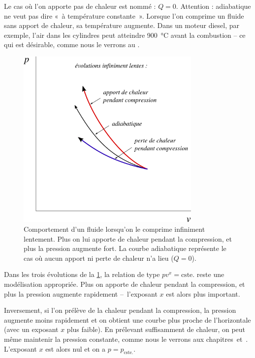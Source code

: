 		Le cas où l’on apporte pas de chaleur est nommé  : $Q = 0$. Attention : adiabatique ne veut pas dire «~à température constante~». Lorsque l’on comprime un fluide sans apport de chaleur, sa température augmente. Dans un moteur diesel, par exemple, l’air dans les cylindres peut atteindre \SI{900}{\degreeCelsius} avant la combustion -- ce qui est désirable, comme nous le verrons au \courssept.

		\begin{figure}
			\begin{center}
			\includegraphics[width=9cm]{images/pv_transfert_chaleur.png}
			\end{center}
			\caption{Comportement d’un fluide lorsqu’on le comprime infiniment lentement.
Plus on lui apporte de chaleur pendant la compression, et plus la pression augmente fort. La courbe adiabatique représente le cas où aucun apport ni perte de chaleur n’a lieu ($Q = 0$).}
			\label{fig_p-v_ajout_retrait_chaleur}
		\end{figure}


		Dans les trois évolutions de la \cref{fig_p-v_ajout_retrait_chaleur}, la relation de type $p v^{x} = \text{cste.}$ reste une modélisation appropriée. Plus on apporte de chaleur pendant la compression, et plus la pression augmente rapidement --\ l’exposant $x$ est alors plus important.

		Inversement, si l’on prélève de la chaleur pendant la compression, la pression augmente moins rapidement et on obtient une courbe plus proche de l’horizontale (avec un exposant  $x$ plus faible). En prélevant suffisamment de chaleur, on peut même maintenir la pression constante, comme nous le verrons aux chapitres~\quatre et~\cinq. L’exposant $x$ est alors nul et on a $p = p_\text{cste.}$.
		
